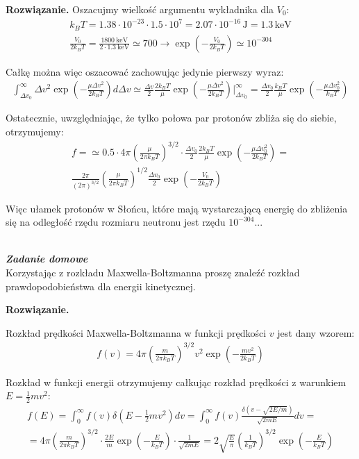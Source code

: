 \documentclass[11pt,a4paper]{article}
\newcounter{zaddom}\newcommand{\zaddom}[1][]{\addtocounter{zaddom}{1} ~\\  {\bf \emph{Zadanie domowe \arabic{zaddom} #1 }} \\}
\newenvironment{solution}{\vspace{1cm} \par\textbf{Rozwiązanie.} \vspace{1cm}}{}
\begin{document}
\begin{solution}
Oszacujmy wielkość argumentu wykładnika dla $V_0$:
\begin{align*}
k_B T = 1.38 \cdot 10^{-23} \cdot 1.5 \cdot 10^7 = 2.07 \cdot 10^{-16}\,\text{J} = 1.3\,\text{keV} \\
\frac{V_0}{2k_B T} = \frac{1800~\text{keV}}{2 \cdot 1.3~\text{keV}} \simeq 700 \to
\exp\left( -\frac{V_0}{2k_B T} \right) \simeq 10^{-304}
\end{align*}

Całkę można więc oszacować zachowując jedynie pierwszy wyraz:
\begin{align*}
\int_{\Delta v_0}^\infty \Delta v^2 \exp\left( -\frac{\mu \Delta v^2}{2 k_B T} \right) d\Delta v \simeq
\frac{\Delta v}{2}\frac{2k_B T}{\mu} \exp\left( -\frac{\mu \Delta v^2}{2 k_B T} \right) \Bigg|_{\Delta v_0}^\infty =
\frac{\Delta v_0}{2}\frac{k_B T}{\mu} \exp\left( -\frac{\mu \Delta v_0^2}{k_B T} \right)
\end{align*}

Ostatecznie, uwzględniając, że tylko połowa par protonów zbliża się do siebie, otrzymujemy:
\begin{align*}
f = \simeq 0.5 \cdot 4\pi \left( \frac{\mu}{2\pi k_B T} \right)^{3/2} \cdot \frac{\Delta v_0}{2}\frac{2k_B T}{\mu} \exp\left( -\frac{\mu \Delta v_0^2}{2 k_B T} \right) = \\
\frac{2\pi}{(2\pi)^{3/2}}\left( \frac{\mu}{2\pi k_B T} \right)^{1/2} \frac{\Delta v_0}{2} \exp\left( -\frac{V_0}{2k_B T} \right) 
\end{align*}

Więc ułamek protonów w Słońcu, które mają wystarczającą energię do zbliżenia się na odległość 
rzędu rozmiaru neutronu jest rzędu $10^{-304}$...

\newpage
\end{solution}

\zaddom[]

Korzystając z rozkładu Maxwella-Boltzmanna proszę znaleźć rozkład
prawdopodobieństwa dla energii kinetycznej.

\begin{solution}

Rozkład prędkości Maxwella-Boltzmanna w funkcji prędkości $v$ jest dany wzorem:
\begin{align*}
f(v) = 4\pi \left( \frac{m}{2\pi k_B T} \right)^{3/2} v^2 \exp\left( -\frac{m v^2}{2 k_B T} \right)
\end{align*}
  
Rozkład w funkcji energii otrzymujemy całkując rozkład prędkości z warunkiem $E = \frac{1}{2} m v^2$:
\begin{align*}
f(E) = \int_0^\infty f(v) \delta\left(E - \frac{1}{2} m v^2\right) dv = 
\int_0^\infty f(v) \frac{\delta(v - \sqrt{2E/m})}{\sqrt{2 m E}} dv = \\
= 4\pi \left( \frac{m}{2\pi k_B T} \right)^{3/2} \cdot \frac{2E}{m} \exp\left( -\frac{E}{k_B T} \right) \cdot \frac{1}{\sqrt{2 m E}} = 
2 \sqrt{\frac{E}{\pi}} \left( \frac{1}{k_B T} \right)^{3/2} \exp\left( -\frac{E}{k_B T} \right)
\end{align*}


\newpage  
\end{solution}
\end{document}
